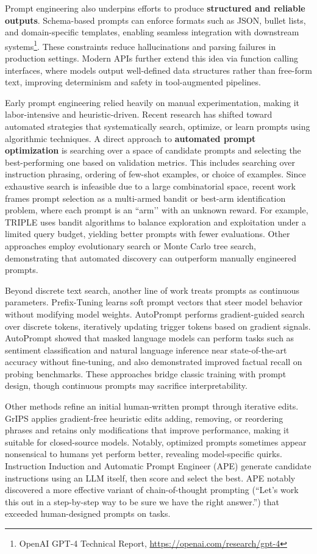 Prompt engineering also underpins efforts to produce \textbf{structured and reliable outputs}. Schema-based prompts can enforce formats such as JSON, bullet lists, and domain-specific templates, enabling seamless integration with downstream systems\footnote{OpenAI GPT-4 Technical Report, \url{https://openai.com/research/gpt-4}}. These constraints reduce hallucinations and parsing failures in production settings. Modern APIs further extend this idea via function calling interfaces, where models output well-defined data structures rather than free-form text, improving determinism and safety in tool-augmented pipelines.

Early prompt engineering relied heavily on manual experimentation, making it labor-intensive and heuristic-driven. Recent research has shifted toward automated strategies that systematically search, optimize, or learn prompts using algorithmic techniques. A direct approach to \textbf{automated prompt optimization} is searching over a space of candidate prompts and selecting the best-performing one based on validation metrics. This includes searching over instruction phrasing, ordering of few-shot examples, or choice of examples. Since exhaustive search is infeasible due to a large combinatorial space, recent work frames prompt selection as a multi-armed bandit or best-arm identification problem, where each prompt is an ``arm’’ with an unknown reward. For example, TRIPLE \cite{shi2024triple} uses bandit algorithms to balance exploration and exploitation under a limited query budget, yielding better prompts with fewer evaluations. Other approaches employ evolutionary search or Monte Carlo tree search, demonstrating that automated discovery can outperform manually engineered prompts.

Beyond discrete text search, another line of work treats prompts as continuous parameters. Prefix-Tuning \cite{li2021prefix} learns soft prompt vectors that steer model behavior without modifying model weights. AutoPrompt \cite{shin2020autoprompt} performs gradient-guided search over discrete tokens, iteratively updating trigger tokens based on gradient signals. AutoPrompt showed that masked language models can perform tasks such as sentiment classification and natural language inference near state-of-the-art accuracy without fine-tuning, and also demonstrated improved factual recall on probing benchmarks. These approaches bridge classic training with prompt design, though continuous prompts may sacrifice interpretability.

Other methods refine an initial human-written prompt through iterative edits. GrIPS \cite{prasad2023grips} applies gradient-free heuristic edits adding, removing, or reordering phrases and retains only modifications that improve performance, making it suitable for closed-source models. Notably, optimized prompts sometimes appear nonsensical to humans yet perform better, revealing model-specific quirks. Instruction Induction and Automatic Prompt Engineer (APE) \cite{zhou2022ape} generate candidate instructions using an LLM itself, then score and select the best. APE notably discovered a more effective variant of chain-of-thought prompting (``Let’s work this out in a step-by-step way to be sure we have the right answer.'') that exceeded human-designed prompts on tasks.

